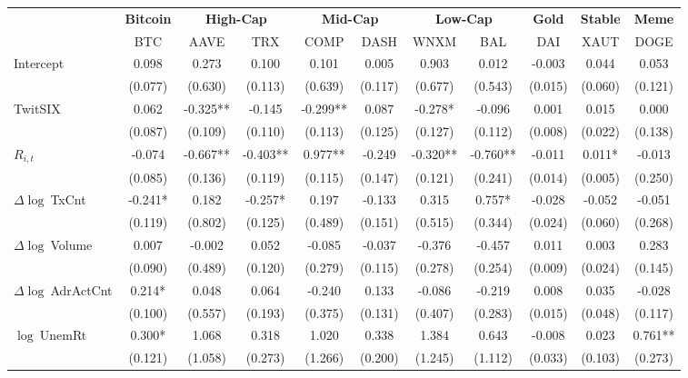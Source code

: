 \begin{table}[ht]
\centering
\scriptsize
\setlength{\tabcolsep}{4pt}
\begin{tabular}{l *{10}{c}}
\toprule
&\multicolumn{1}{c}{\textbf{Bitcoin}}&\multicolumn{2}{c}{\textbf{High-Cap}}&\multicolumn{2}{c}{\textbf{Mid-Cap}}&\multicolumn{2}{c}{\textbf{Low-Cap}}&\multicolumn{1}{c}{\textbf{Gold}}&\multicolumn{1}{c}{\textbf{Stable}}&\multicolumn{1}{c}{\textbf{Meme}}\\
\addlinespace
 & BTC & AAVE & TRX & COMP & DASH & WNXM & BAL & DAI & XAUT & DOGE \\
\midrule
Intercept & 0.098 & 0.273 & 0.100 & 0.101 & 0.005 & 0.903 & 0.012 & -0.003 & 0.044 & 0.053 \\
 & (0.077) & (0.630) & (0.113) & (0.639) & (0.117) & (0.677) & (0.543) & (0.015) & (0.060) & (0.121) \\
\addlinespace
TwitSIX & 0.062 & -0.325** & -0.145 & -0.299** & 0.087 & -0.278* & -0.096 & 0.001 & 0.015 & 0.000 \\
 & (0.087) & (0.109) & (0.110) & (0.113) & (0.125) & (0.127) & (0.112) & (0.008) & (0.022) & (0.138) \\
\addlinespace
$R_{i,t}$ & -0.074 & -0.667** & -0.403** & 0.977** & -0.249 & -0.320** & -0.760** & -0.011 & 0.011* & -0.013 \\
 & (0.085) & (0.136) & (0.119) & (0.115) & (0.147) & (0.121) & (0.241) & (0.014) & (0.005) & (0.250) \\
\addlinespace
$\Delta\log\ $TxCnt & -0.241* & 0.182 & -0.257* & 0.197 & -0.133 & 0.315 & 0.757* & -0.028 & -0.052 & -0.051 \\
 & (0.119) & (0.802) & (0.125) & (0.489) & (0.151) & (0.515) & (0.344) & (0.024) & (0.060) & (0.268) \\
\addlinespace
$\Delta\log\ $Volume & 0.007 & -0.002 & 0.052 & -0.085 & -0.037 & -0.376 & -0.457 & 0.011 & 0.003 & 0.283 \\
 & (0.090) & (0.489) & (0.120) & (0.279) & (0.115) & (0.278) & (0.254) & (0.009) & (0.024) & (0.145) \\
\addlinespace
$\Delta\log\ $AdrActCnt & 0.214* & 0.048 & 0.064 & -0.240 & 0.133 & -0.086 & -0.219 & 0.008 & 0.035 & -0.028 \\
 & (0.100) & (0.557) & (0.193) & (0.375) & (0.131) & (0.407) & (0.283) & (0.015) & (0.048) & (0.117) \\
\addlinespace
$\log\ $UnemRt & 0.300* & 1.068 & 0.318 & 1.020 & 0.338 & 1.384 & 0.643 & -0.008 & 0.023 & 0.761** \\
 & (0.121) & (1.058) & (0.273) & (1.266) & (0.200) & (1.245) & (1.112) & (0.033) & (0.103) & (0.273) \\

\end{tabular}
\end{table}
